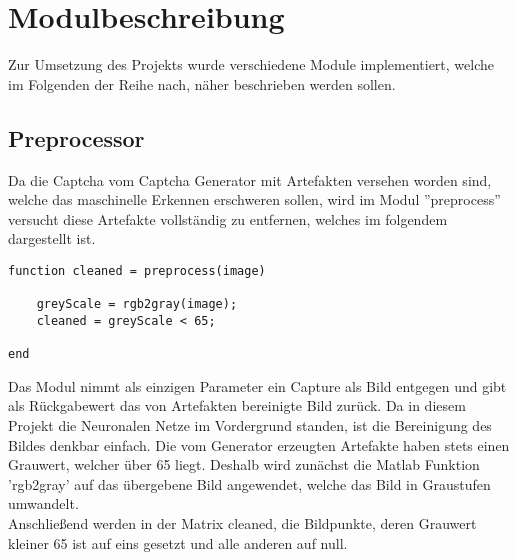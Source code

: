 \section{Modulbeschreibung}
Zur Umsetzung des Projekts wurde verschiedene Module implementiert, welche im Folgenden der Reihe nach, näher beschrieben werden sollen.
\subsection{Preprocessor}
Da die Captcha vom Captcha Generator mit Artefakten versehen worden sind, welche das maschinelle Erkennen erschweren sollen, wird im Modul ''preprocess'' versucht diese Artefakte vollständig zu entfernen, welches im folgendem dargestellt ist.
\begin{lstlisting}
function cleaned = preprocess(image)

	greyScale = rgb2gray(image);
	cleaned = greyScale < 65;

end
\end{lstlisting}
Das Modul nimmt als einzigen Parameter ein Capture als Bild entgegen und gibt als Rückgabewert das von Artefakten bereinigte Bild zurück. Da in diesem Projekt die Neuronalen Netze im Vordergrund standen, ist die Bereinigung des Bildes denkbar einfach. Die vom Generator erzeugten Artefakte haben stets einen Grauwert, welcher über 65 liegt. Deshalb wird zunächst die Matlab Funktion 'rgb2gray' auf das übergebene Bild angewendet, welche das Bild in Graustufen umwandelt.\\
Anschließend werden in der Matrix cleaned, die Bildpunkte, deren Grauwert kleiner 65 ist auf eins gesetzt und alle anderen auf null.

